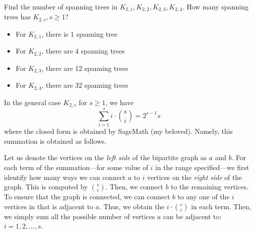 \question
  Find the number of spanning trees in $K_{2,1}, K_{2,2}, K_{2,3}, K_{2,4}$.
  How many spanning trees has $K_{2, s}, s \geq 1$?

  \begin{solution}
    \begin{itemize}
      \item For \(K_{2, 1}\), there is 1 spanning tree
      \item For \(K_{2, 2}\), there are 4 spanning trees
      \item For \(K_{2, 3}\), there are 12 spanning trees
      \item For \(K_{2, 4}\), there are 32 spanning trees 
    \end{itemize}

    In the general case \(K_{2, s}\) for \(s \geq 1\), we have 
    \[ \sum_{i=1}^s i \cdot \binom{s}{i} = 2^{s-1}s \]
    where the closed form is obtained by SageMath (my beloved). Namely, this
    summation is obtained as follows. 

    Let us denote the vertices on the \textit{left side} of the bipartite
    graph as \(a\) and \(b\). For each term of the summation---for some
    value of \(i\) in the range specified---we first identify how many ways
    we can connect \(a\) to \(i\) vertices on the \textit{right side} of the
    graph. This is computed by \(\binom{s}{i}\). Then, we connect \(b\) to
    the remaining vertices. To ensure that the graph is connected, we can 
    connect \(b\) to any one of the \(i\) vertices in that is adjacent to
    \(a\). Thus, we obtain the \(i \cdot \binom{s}{i}\) in each term. Then,
    we simply sum all the possible number of vertices \(a\) can be adjacent
    to: \(i = 1, 2, \ldots, s\).
  \end{solution}
